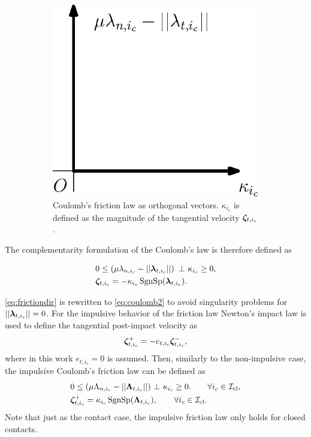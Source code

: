 \documentclass[../DC2017114Bouma.tex]{subfiles}
\begin{document}
\begin{figure}[h]
\begin{subfigure}{0.3\textwidth}
\includegraphics[width=\linewidth]{coulombort.eps}\caption{Coulomb's friction law as orthogonal vectors. $\kappa_{i_c}$ is defined as the magnitude of the tangential velocity $\boldsymbol{\zeta}_{t,i_c}$.}\label{fig:coulombort}
\end{subfigure}
\caption{}
\end{figure}

The complementarity formulation of the Coulomb's law is therefore defined as

\begin{align}
&0\leq \left(\mu\lambda_{n,i_c} - ||\lambdab_{t,i_c}||\right)\ \bot\ \kappa_{i_c} \geq 0,\label{eq:coulomb1}\\
&\zetab_{t,i_c} = -\kappa_{i_c}\SgnSp(\lambdab_{t,i_c}).\label{eq:coulomb2}
\end{align}

\eqref{eq:frictiondir} is rewritten to \eqref{eq:coulomb2} to avoid singularity problems for $||\boldsymbol{\lambda}_{t,i_c}|| = 0$. For the impulsive behavior of the friction law Newton's impact law is used to define the tangential post-impact velocity as
\begin{align}
\boldsymbol{\zeta}^+_{t,i_c} = -e_{t,i_c}\boldsymbol{\zeta}^-_{t,i_c},
\end{align}
where in this work $e_{t,i_c}=0$ is assumed. Then, similarly to the non-impulsive case, the impulsive Coulomb's friction law can be defined as
\begin{align}
&0 \leq (\mu\Lambda_{n,i_c} - ||\Lambdab_{t,i_c}||)\ \bot\ \kappa_{i_c} \geq 0. \qquad \forall i_c\in\Ic_{\text{cl}},\label{eq:coulombimp1}\\
&\zetab_{t,i_c}^+ = \kappa_{i_c}\SgnSp(\Lambdab_{t,i_c}),\qquad \forall i_c\in\Ic_{\text{cl}}.\label{eq:coulombimp2}
\end{align}
Note that just as the contact case, the impulsive friction law only holds for closed contacts.
\end{document}
